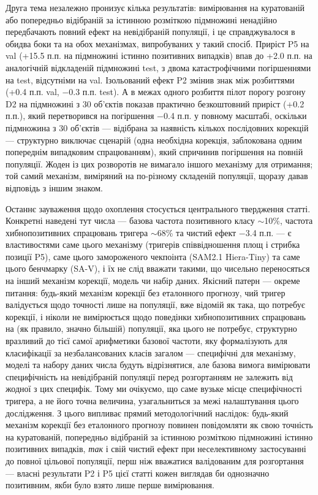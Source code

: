 \documentclass[11pt]{article}
\begin{document}
Друга тема незалежно пронизує кілька результатів: вимірювання на куратованій або попередньо відібраній за істинною розміткою підмножині ненадійно передбачають повний ефект на невідібраній популяції, і це справджувалося в обидва боки та на обох механізмах, випробуваних у такий спосіб. Приріст P5 на val (+15.5 п.п. на підмножині істинно позитивних випадків) впав до +2.0 п.п. на аналогічній відкладеній підмножині test, з двома катастрофічними погіршеннями на test, відсутніми на val. Ізольований ефект P2 змінив знак між розбиттями (+0.4 п.п. val, −0.3 п.п. test). А в межах одного розбиття пілот порогу розгону D2 на підмножині з 30 об'єктів показав практично безкоштовний приріст (+0.2 п.п.), який перетворився на погіршення −0.4 п.п. у повному масштабі, оскільки підмножина з 30 об'єктів --- відібрана за наявність кількох послідовних корекцій --- структурно виключає сценарій (одна необхідна корекція, заблокована одним попереднім випадковим спрацюванням), який спричинив погіршення на повній популяції. Жоден із цих розворотів не вимагало іншого механізму для отримання; той самий механізм, виміряний на по-різному складеній популяції, щоразу давав відповідь з іншим знаком.

Останнє зауваження щодо охоплення стосується центрального твердження статті. Конкретні наведені тут числа --- базова частота позитивного класу $\sim$10\%, частота хибнопозитивних спрацювань тригера $\sim$68\% та чистий ефект −3.4 п.п. --- є властивостями саме цього механізму (тригерів співвідношення площ і стрибка позиції P5), саме цього замороженого чекпоінта (SAM2.1 Hiera-Tiny) та саме цього бенчмарку (SA-V), і їх не слід вважати такими, що чисельно переносяться на інший механізм корекції, модель чи набір даних. Якісний патерн --- окреме питання: будь-який механізм корекції без еталонного прогнозу, чий тригер валідується щодо точності лише на популяції, вже відомій як така, що потребує корекції, і ніколи не вимірюється щодо поведінки хибнопозитивних спрацювань на (як правило, значно більшій) популяції, яка цього не потребує, структурно вразливий до тієї самої арифметики базової частоти, яку формалізують \citet{saito2015} для класифікації за незбалансованих класів загалом --- специфічні для механізму, моделі та набору даних числа будуть відрізнятися, але базова вимога вимірювати специфічність на невідібраній популяції перед розгортанням не залежить від жодної з цих специфік. Тому ми очікуємо, що саме вузьке місце специфічності тригера, а не його точна величина, узагальниться за межі налаштування цього дослідження. З цього випливає прямий методологічний наслідок: будь-який механізм корекції без еталонного прогнозу повинен повідомляти як свою точність на куратованій, попередньо відібраній за істинною розміткою підмножині істинно позитивних випадків, \emph{так} і свій чистий ефект при неселективному застосуванні до повної цільової популяції, перш ніж вважатися валідованим для розгортання --- власні результати P2 і P5 цієї статті кожен виглядав би однозначно позитивним, якби було взято лише перше вимірювання.
\end{document}
